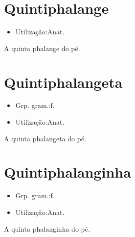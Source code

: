 \section{Quintiphalange}
\begin{itemize}
\item {Utilização:Anat.}
\end{itemize}
A quinta phalange do pé.
\section{Quintiphalangeta}
\begin{itemize}
\item {Grp. gram.:f.}
\end{itemize}
\begin{itemize}
\item {Utilização:Anat.}
\end{itemize}
A quinta phalangeta do pé.
\section{Quintiphalanginha}
\begin{itemize}
\item {Grp. gram.:f.}
\end{itemize}
\begin{itemize}
\item {Utilização:Anat.}
\end{itemize}
A quinta phalanginha do pé.
